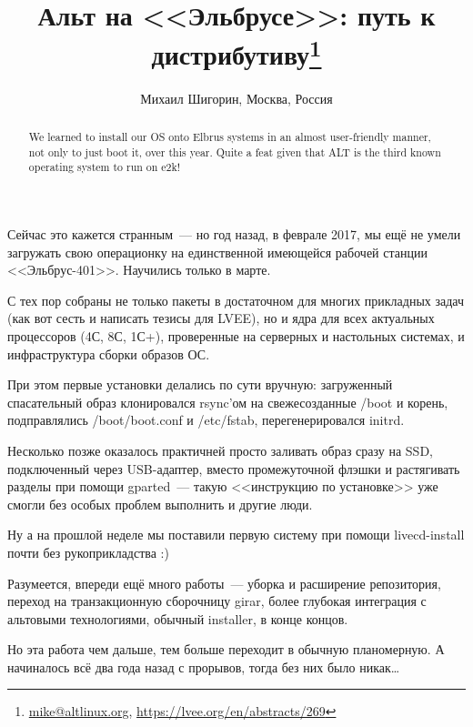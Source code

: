 \documentclass[10pt, a5paper]{article}
\begin{document}
\title{Альт на <<Эльбрусе>>: путь к дистрибутиву\footnote{\url{mike@altlinux.org}, \url{https://lvee.org/en/abstracts/269}}}
\author{Михаил Шигорин, Москва, Россия}
\maketitle
\begin{abstract}
We learned to install our OS onto Elbrus systems in an almost user-friendly manner, not only to just boot it, over this year. Quite a feat given that ALT is the third known operating system to run on e2k!
\end{abstract}
Сейчас это кажется странным~--- но год назад, в феврале 2017, мы ещё не умели загружать свою операционку на единственной имеющейся рабочей станции <<Эльбрус-401>>.  Научились только в марте.

С тех пор собраны не только пакеты в достаточном для многих прикладных задач (как вот сесть и написать тезисы для LVEE), но и ядра для всех актуальных процессоров (4С, 8С, 1С+), проверенные на серверных и настольных системах, и инфраструктура сборки образов ОС.

При этом первые установки делались по сути вручную: загруженный спасательный образ клонировался rsync'ом на свежесозданные /boot и корень, подправлялись /boot/boot.conf и /etc/fstab, перегенерировался initrd.

Несколько позже оказалось практичней просто заливать образ сразу на SSD, подключенный через USB-адаптер, вместо промежуточной флэшки и растягивать разделы при помощи gparted~--- такую <<инструкцию по установке>> уже смогли без особых проблем выполнить и другие люди.

Ну а на прошлой неделе мы поставили первую систему при помощи livecd-install почти без рукоприкладства :)

Разумеется, впереди ещё много работы~--- уборка и расширение репозитория, переход на транзакционную сборочницу girar, более глубокая интеграция с альтовыми технологиями, обычный installer, в конце концов.

Но эта работа чем дальше, тем больше переходит в обычную планомерную.  А начиналось всё два года назад с прорывов, тогда без них было никак\ldots{}


\end{document}
